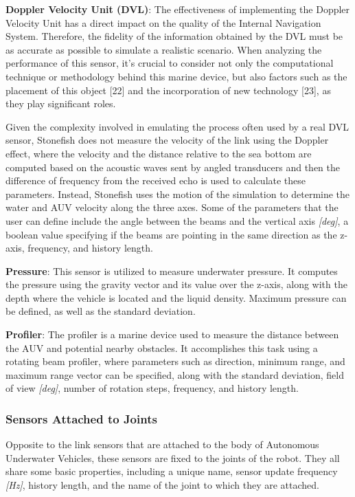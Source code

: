 \documentclass[]{article}
\begin{document}
		\textbf{Doppler Velocity Unit (DVL)}: The effectiveness of implementing the Doppler Velocity Unit has a direct impact on the quality of the Internal Navigation System. Therefore, the fidelity of the information obtained by the DVL must be as accurate as possible to simulate a realistic scenario. When analyzing the performance of this sensor, it's crucial to consider not only the computational technique or methodology behind this marine device, but also factors such as the placement of this object [22] and the incorporation of new technology [23], as they play significant roles.
		
		Given the complexity involved in emulating the process often used by a real DVL sensor, Stonefish does not measure the velocity of the link using the Doppler effect, where the velocity and the distance relative to the sea bottom are computed based on the acoustic waves sent by angled transducers and then the difference of frequency from the received echo is used to calculate these parameters. Instead, Stonefish uses the motion of the simulation to determine the water and AUV velocity along the three axes. Some of the parameters that the user can define include the angle between the beams and the vertical axis \textit{[deg]}, a boolean value specifying if the beams are pointing in the same direction as the z-axis, frequency, and history length.
		
		\textbf{Pressure}: This sensor is utilized to measure underwater pressure. It computes the pressure using the gravity vector and its value over the z-axis, along with the depth where the vehicle is located and the liquid density. Maximum pressure can be defined, as well as the standard deviation.
		
		\textbf{Profiler}: The profiler is a marine device used to measure the distance between the AUV and potential nearby obstacles. It accomplishes this task using a rotating beam profiler, where parameters such as direction, minimum range, and maximum range vector can be specified, along with the standard deviation, field of view \textit{[deg]}, number of rotation steps, frequency, and history length.
		
		\subsubsection{Sensors Attached to Joints}
		
		Opposite to the link sensors that are attached to the body of Autonomous Underwater Vehicles, these sensors are fixed to the joints of the robot. They all share some basic properties, including a unique name, sensor update frequency \textit{[Hz]}, history length, and the name of the joint to which they are attached.
		
\end{document}
